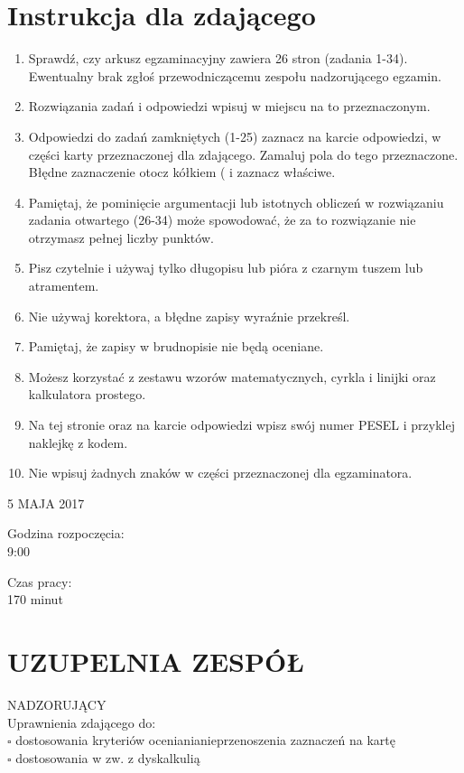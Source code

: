 \documentclass[10pt]{article}
\begin{document}
\section*{Instrukcja dla zdającego}
\begin{enumerate}
  \item Sprawdź, czy arkusz egzaminacyjny zawiera 26 stron (zadania 1-34). Ewentualny brak zgłoś przewodniczącemu zespołu nadzorującego egzamin.
  \item Rozwiązania zadań i odpowiedzi wpisuj w miejscu na to przeznaczonym.
  \item Odpowiedzi do zadań zamkniętych (1-25) zaznacz na karcie odpowiedzi, w części karty przeznaczonej dla zdającego. Zamaluj pola do tego przeznaczone. Błędne zaznaczenie otocz kółkiem ( i zaznacz właściwe.
  \item Pamiętaj, że pominięcie argumentacji lub istotnych obliczeń w rozwiązaniu zadania otwartego (26-34) może spowodować, że za to rozwiązanie nie otrzymasz pełnej liczby punktów.
  \item Pisz czytelnie i używaj tylko długopisu lub pióra z czarnym tuszem lub atramentem.
  \item Nie używaj korektora, a błędne zapisy wyraźnie przekreśl.
  \item Pamiętaj, że zapisy w brudnopisie nie będą oceniane.
  \item Możesz korzystać z zestawu wzorów matematycznych, cyrkla i linijki oraz kalkulatora prostego.
  \item Na tej stronie oraz na karcie odpowiedzi wpisz swój numer PESEL i przyklej naklejkę z kodem.
  \item Nie wpisuj żadnych znaków w części przeznaczonej dla egzaminatora.
\end{enumerate}

5 MAJA 2017

Godzina rozpoczęcia:\\
9:00

Czas pracy:\\
170 minut

\section*{UZUPELNIA ZESPÓŁ}
NADZORUJĄCY\\
Uprawnienia zdającego do:\\
\(\square\) dostosowania kryteriów ocenianianieprzenoszenia zaznaczeń na kartę\\
\(\square\) dostosowania w zw. z dyskalkulią
\end{document}
